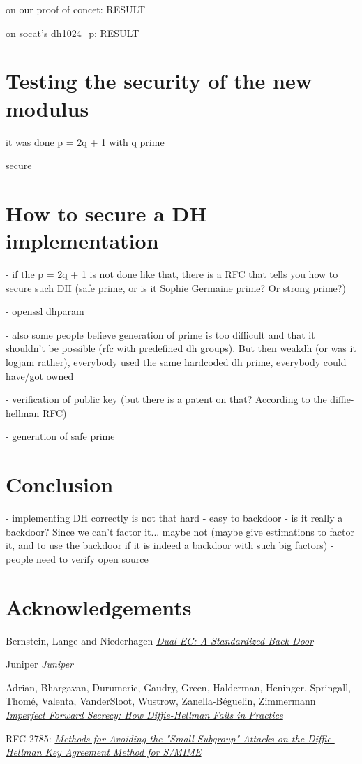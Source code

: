 \documentclass[a4paper,11pt]{article}
\begin{document}
on our proof of concet: RESULT

on socat's dh1024_p: RESULT

\section{Testing the security of the new modulus}

it was done p = 2q + 1 with q prime

secure

\section{How to secure a DH implementation}

- if the p = 2q + 1 is not done like that, there is a RFC that tells you how to secure such DH (safe prime, or is it Sophie Germaine prime? Or strong prime?)

- openssl dhparam

- also some people believe generation of prime is too difficult and that it shouldn't be possible (rfc with predefined dh groups). But then weakdh (or was it logjam rather), everybody used the same hardcoded dh prime, everybody could have/got owned

- verification of public key (but there is a patent on that? According to the diffie-hellman RFC)

- generation of safe prime

\section{Conclusion}

- implementing DH correctly is not that hard
- easy to backdoor
- is it really a backdoor? Since we can't factor it... maybe not (maybe give estimations to factor it, and to use the backdoor if it is indeed a backdoor with such big factors)
- people need to verify open source

\newpage

\section*{Acknowledgements}


\newpage

\begin{thebibliography}{1}

 Bernstein, Lange and Niederhagen {\em \href{https://eprint.iacr.org/2015/767.pdf}{Dual EC: A Standardized Back Door}}

 Juniper {\em Juniper}

 Adrian, Bhargavan, Durumeric, Gaudry, Green, Halderman, Heninger, Springall, Thomé, Valenta,  VanderSloot, Wustrow, Zanella-Béguelin, Zimmermann \em{\href{https://weakdh.org/imperfect-forward-secrecy-ccs15.pdf}{Imperfect Forward Secrecy: How Diffie-Hellman Fails in Practice}}

 RFC 2785: \em{\href{https://tools.ietf.org/html/rfc2785}{Methods for Avoiding the "Small-Subgroup" Attacks on the Diffie-Hellman Key Agreement Method for S/MIME}}

\end{thebibliography}
\end{document}

